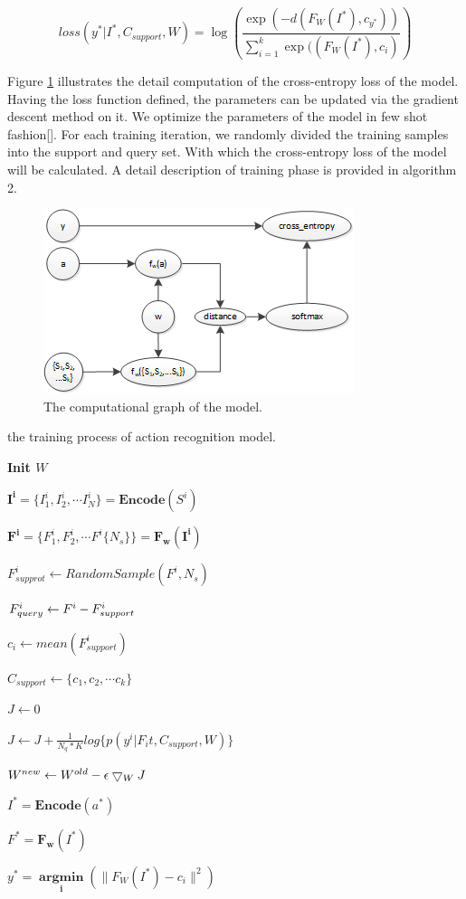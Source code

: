 \documentclass{bmvc2k}
\newcommand{\reffig}[1]{Figure \ref{#1}}
\begin{document}
$$loss( y^\ast | I^\ast,C_{support},W)=\log(\frac{\exp (-d(F_W(I^\ast),c_{y^\ast}))}{\sum_{i=1}^{k}\exp((F_W(I^\ast),c_i)})$$

\reffig{fig:5} illustrates the detail computation of the cross-entropy loss of the model. Having the loss function defined, the parameters can be updated via the gradient descent method on it. We optimize the parameters of the model in few shot fashion[]. For each training iteration, we randomly divided the training samples into the support and query set. With which the cross-entropy loss of the model will be calculated. A detail description of training phase is provided in algorithm 
2.
\begin{figure}[htb]
\centering
\includegraphics{images/Figure_5.png}
\caption{The computational graph of the model.}
\label{fig:5}
\end{figure}

\begin{algorithm}
	\caption{ the training process of action recognition model.}
	\label{alg:2}
	\bf{Init $W$}
	
	{
		$\mathbf{I^i}=\{I^i_1,I^i_2,\cdots I^i_N\}=\mathbf{Encode}(S^i)$
		
		$\mathbf{F^i}=\{F^i_1,F^i_2,\cdots F^i \{ N_s \} \}=\mathbf{F_w(I^i)}$
	}	
			
	\Repeat{}
	{
		{
			$F^i_{supprot}\leftarrow RandomSample(F^i,N_s)$
			
			$F^i_{query}\leftarrow F^i\-- F^i_{support}$
			
			$c_i\leftarrow mean(F^i_{support})$
		}
		$C_{support}\leftarrow \{c_1,c_2,\cdots c_k\}$
		
		$J\leftarrow0$
		
		{
			{
				
				$J\leftarrow J+ \frac{1}{N_q*K}log\{p(y^i|F_it,C_{support},W)\}$
			}	
		}
		$W^{new}\leftarrow W^{old}\-- \epsilon\bigtriangledown_W J$
	}
	
	$I^\ast = \mathbf{Encode}(a^\ast) $
	
	$F^\ast = \mathbf{F_w}(I^\ast)$
	
	$y^\ast=\mathop{\mathbf{argmin}}\limits_{\mathbf{i}} \left( \lVert F_W \left( I^\ast \right) - c_i \rVert^2 \right)$
\end{algorithm}
\end{document}
